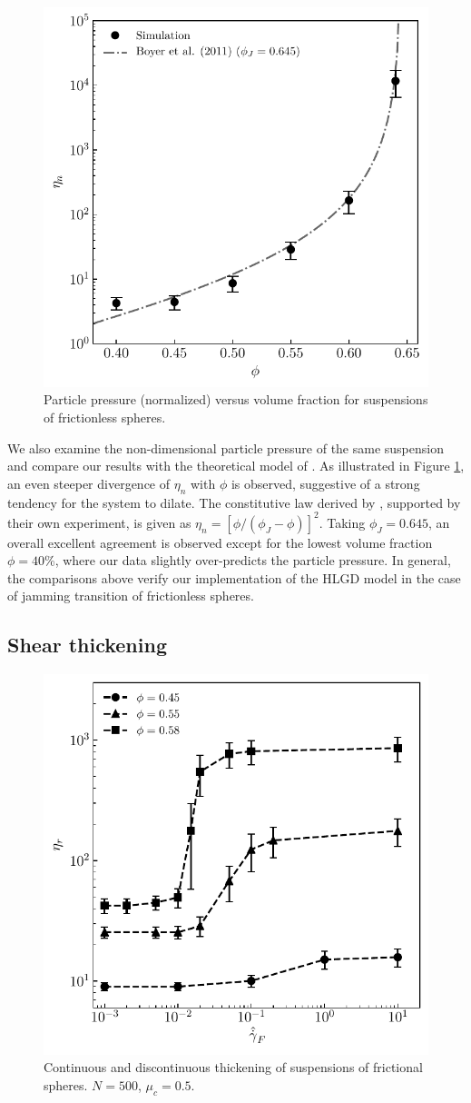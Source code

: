 \begin{figure}%
  \centering
  \includegraphics[width=0.64\columnwidth]{figs/curve_pp_fricless.pdf}
  \caption{Particle pressure (normalized) versus volume fraction for suspensions of frictionless spheres.}
  \label{fig:pres}
\end{figure}

We also examine the non-dimensional particle pressure of the same suspension and compare our results with the theoretical model of \cite{Boyer_Guaz_Poul_2011}. As illustrated in Figure \ref{fig:pres}, an even steeper divergence of $\eta_n$ with $\phi$ is observed, suggestive of a strong tendency for the system to dilate. The constitutive law derived by \cite{Boyer_Guaz_Poul_2011}, supported by their own experiment, is given as $\eta_n=[\phi/(\phi_J-\phi)]^2$. Taking $\phi_J=0.645$, an overall excellent agreement is observed except for the lowest volume fraction $\phi=40$\%, where our data slightly over-predicts the particle pressure. In general, the comparisons above verify our implementation of the HLGD model in the case of jamming transition of frictionless spheres. 


\subsection{Shear thickening}

\begin{figure}%
  \centering
  \includegraphics[width=0.64\columnwidth]{figs/curve_visc_mu0.5.pdf}
  \caption{Continuous and discontinuous thickening of suspensions of frictional spheres. $N=500$, $\mu_c=0.5$.}
  \label{fig:thick}
\end{figure}

